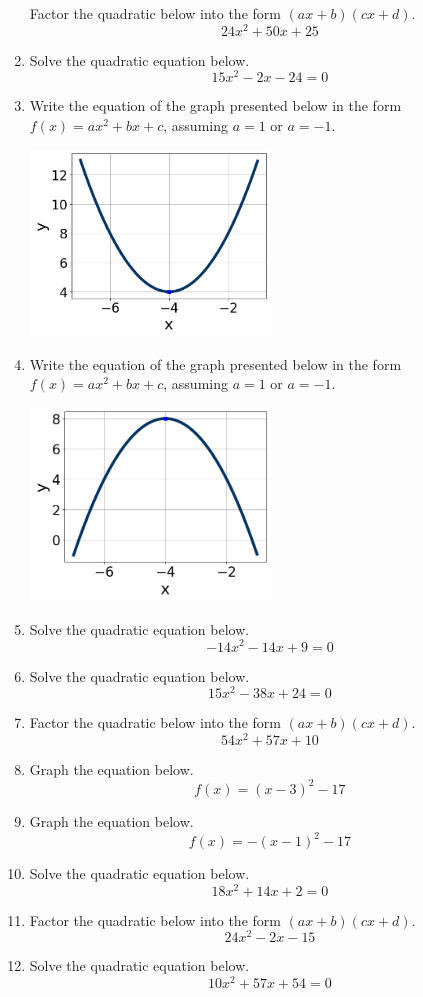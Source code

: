 \documentclass[14pt]{extbook}
\begin{document}
\begin{enumerate}
{Factor the quadratic below into the form $(ax+b)(cx+d)$.\[ 24x^{2} +50 x + 25 \]} \newpage
\item{
Solve the quadratic equation below.\[ 15x^{2} -2 x -24 = 0 \]} \newpage
\item{
Write the equation of the graph presented below in the form $f(x)=ax^2+bx+c$, assuming  $a=1$ or $a=-1$.
\begin{center}
    \includegraphics[width=0.5\textwidth]{../Figures/quadraticGraphToEquationCopyC.png}
\end{center}
} \newpage
\item{
Write the equation of the graph presented below in the form $f(x)=ax^2+bx+c$, assuming  $a=1$ or $a=-1$.
\begin{center}
    \includegraphics[width=0.5\textwidth]{../Figures/quadraticGraphToEquationC.png}
\end{center}
} \newpage
\item{
Solve the quadratic equation below.\[ -14x^{2} -14 x + 9 = 0 \]} \newpage
\item{
Solve the quadratic equation below.\[ 15x^{2} -38 x + 24 = 0 \]} \newpage
\item{
Factor the quadratic below into the form $(ax+b)(cx+d)$.\[ 54x^{2} +57 x + 10 \]} \newpage
\item{
Graph the equation below.\[ f(x) = (x-3)^2 - 17 \]} \newpage
\item{
Graph the equation below.\[ f(x) = -(x-1)^2 - 17 \]} \newpage
\item{
Solve the quadratic equation below.\[ 18x^{2} +14 x + 2 = 0 \]} \newpage
\item{
Factor the quadratic below into the form $(ax+b)(cx+d)$.\[ 24x^{2} -2 x -15 \]} \newpage
\item{
Solve the quadratic equation below.\[ 10x^{2} +57 x + 54 = 0 \]} \newpage
\end{enumerate}
\end{document}
